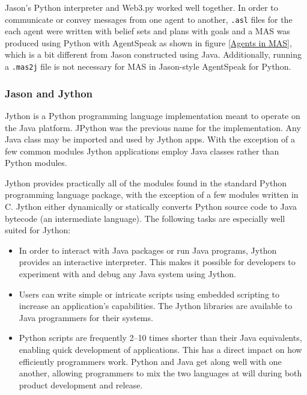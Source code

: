 \vspace{.5cm}

Jason's Python interpreter and Web3.py worked well together. In order to communicate or convey messages from one agent to another, \texttt{.asl} files for the each agent were written with belief sets and plans with goals and a \ac{MAS} was produced using Python with AgentSpeak as shown in figure \ref{Agents in MAS}, which is a bit different from Jason constructed using Java. Additionally, running a \texttt{.mas2j} file is not necessary for \ac{MAS} in Jason-style AgentSpeak for Python.

\subsubsection{Jason and Jython}

Jython is a Python programming language implementation meant to operate on the Java platform. JPython was the previous name for the implementation. Any Java class may be imported and used by Jython apps. With the exception of a few common modules Jython applications employ Java classes rather than Python modules. 

\vspace{.5cm}
Jython provides practically all of the modules found in the standard Python programming language package, with the exception of a few modules written in C. Jython either dynamically or statically converts Python source code to Java bytecode (an intermediate language). The following tasks are especially well suited for Jython:

\begin{itemize}
    \item In order to interact with Java packages or run Java programs, Jython provides an interactive interpreter. This makes it possible for developers to experiment with and debug any Java system using Jython.
    \vspace{.5cm}
    \item Users can write simple or intricate scripts using embedded scripting to increase an application's capabilities. The Jython libraries are available to Java programmers for their systems.
    \vspace{.5cm}
     \item Python scripts are frequently 2–10 times shorter than their Java equivalents, enabling quick development of applications. This has a direct impact on how efficiently programmers work. Python and Java get along well with one another, allowing programmers to mix the two languages at will during both product development and release.
\end{itemize}

